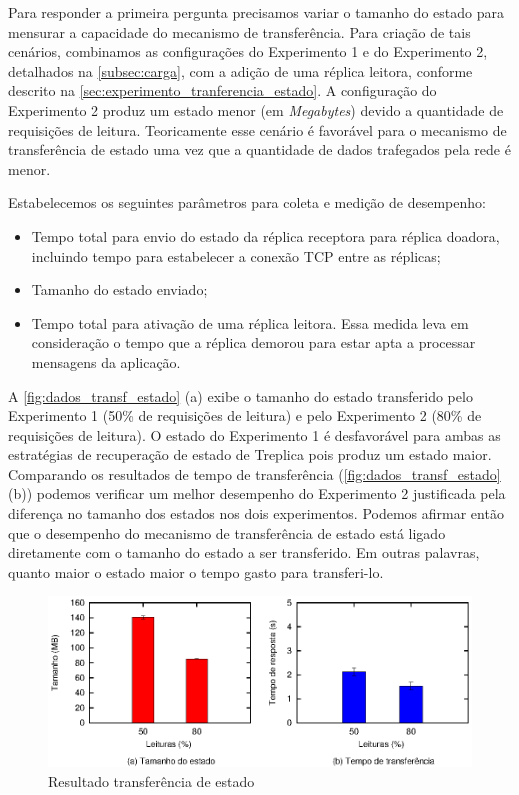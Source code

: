 Para responder a primeira pergunta precisamos variar o tamanho do estado para mensurar a
capacidade do mecanismo de transferência. Para criação de tais cenários, combinamos as
configurações do Experimento 1 e do Experimento 2, detalhados na \autoref{subsec:carga},
com a adição de uma réplica leitora, conforme descrito na
\autoref{sec:experimento_tranferencia_estado}. A configuração do Experimento 2 produz um
estado menor (em \emph{Megabytes}) devido a quantidade de requisições de leitura.
Teoricamente esse cenário é favorável para o mecanismo de transferência de estado uma vez
que a quantidade de dados trafegados pela rede é menor.

Estabelecemos os seguintes parâmetros para coleta e medição de desempenho:

\begin{itemize}
  \item Tempo total para envio do estado da réplica receptora para réplica doadora,
    incluindo tempo para estabelecer a conexão TCP entre as réplicas;
  \item Tamanho do estado enviado;
  \item Tempo total para ativação de uma réplica leitora. Essa medida leva em consideração
    o tempo que a réplica demorou para estar apta a processar mensagens da aplicação.
\end{itemize}

A \autoref{fig:dados_transf_estado} (a) exibe o tamanho do estado transferido pelo
Experimento 1 (50\% de requisições de leitura) e pelo Experimento 2 (80\% de requisições
de leitura). O estado do Experimento 1 é desfavorável para ambas as estratégias de
recuperação de estado de Treplica pois produz um estado maior. Comparando os resultados de
tempo de transferência (\autoref{fig:dados_transf_estado} (b)) podemos verificar um melhor
desempenho do Experimento 2 justificada pela diferença no tamanho dos estados nos dois
experimentos. Podemos afirmar então que o desempenho do mecanismo de transferência de
estado está ligado diretamente com o tamanho do estado a ser transferido. Em outras
palavras, quanto maior o estado maior o tempo gasto para transferi-lo.

\begin{figure}[ht]
  \centering
  \includegraphics[width=14cm]{conteudo/capitulos/figuras/dados-transf.eps}
  \caption{Resultado transferência de estado}
  \label{fig:dados_transf_estado}
\end{figure}

